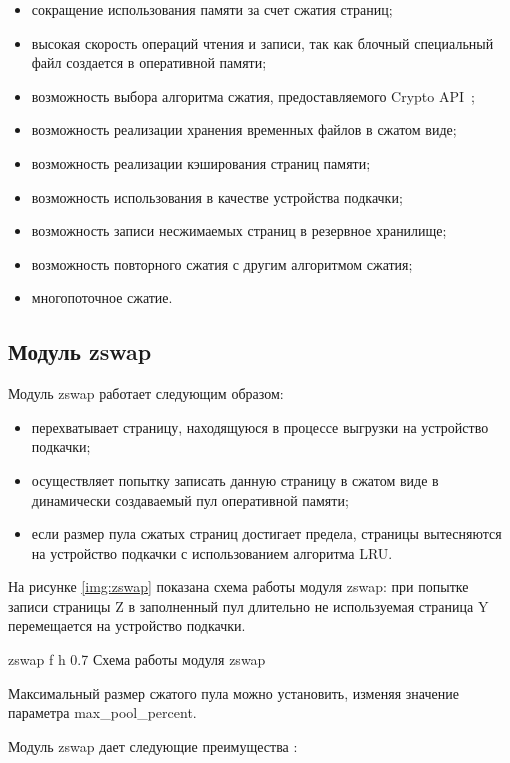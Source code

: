 \begin{itemize}
	\item сокращение использования памяти за счет сжатия страниц;
	\item высокая скорость операций чтения и записи, так как блочный специальный файл создается в оперативной памяти;
    \item возможность выбора алгоритма сжатия, предоставляемого Crypto API~\cite{crypto};
    \item возможность реализации хранения временных файлов в сжатом виде;
    \item возможность реализации кэширования страниц памяти;
    \item возможность использования в качестве устройства подкачки;
    \item возможность записи несжимаемых страниц в резервное хранилище;
    \item возможность повторного сжатия с другим алгоритмом сжатия;
    \item многопоточное сжатие.
\end{itemize}

\subsection{Модуль zswap}

Модуль zswap работает следующим образом:

\begin{itemize}
    \item перехватывает страницу, находящуюся в процессе выгрузки на устройство подкачки;
    \item осуществляет попытку записать данную страницу в сжатом виде в динамически создаваемый пул оперативной памяти;
    \item если размер пула сжатых страниц достигает предела, страницы вытесняются на устройство подкачки с использованием алгоритма LRU.
\end{itemize}

На рисунке \ref{img:zswap} показана схема работы модуля zswap: при попытке записи страницы Z в заполненный пул длительно не используемая страница Y перемещается на устройство подкачки.

    {zswap}
    {f}
    {h}
    {0.7\textwidth}
    {Схема работы модуля zswap}

Максимальный размер сжатого пула можно установить, изменяя значение параметра max\_pool\_percent.

Модуль zswap дает следующие преимущества \cite{zswap}:

